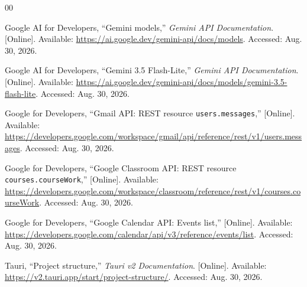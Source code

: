 \documentclass[conference]{IEEEtran}
\begin{document}
\begin{thebibliography}{00}

Google AI for Developers, ``Gemini models,'' \emph{Gemini API Documentation}. [Online]. Available: \url{https://ai.google.dev/gemini-api/docs/models}. Accessed: Aug. 30, 2026.

Google AI for Developers, ``Gemini 3.5 Flash-Lite,'' \emph{Gemini API Documentation}. [Online]. Available: \url{https://ai.google.dev/gemini-api/docs/models/gemini-3.5-flash-lite}. Accessed: Aug. 30, 2026.

Google for Developers, ``Gmail API: REST resource \texttt{users.messages},'' [Online]. Available: \url{https://developers.google.com/workspace/gmail/api/reference/rest/v1/users.messages}. Accessed: Aug. 30, 2026.

Google for Developers, ``Google Classroom API: REST resource \texttt{courses.courseWork},'' [Online]. Available: \url{https://developers.google.com/workspace/classroom/reference/rest/v1/courses.courseWork}. Accessed: Aug. 30, 2026.

Google for Developers, ``Google Calendar API: Events list,'' [Online]. Available: \url{https://developers.google.com/calendar/api/v3/reference/events/list}. Accessed: Aug. 30, 2026.

Tauri, ``Project structure,'' \emph{Tauri v2 Documentation}. [Online]. Available: \url{https://v2.tauri.app/start/project-structure/}. Accessed: Aug. 30, 2026.

\end{thebibliography}
\end{document}
